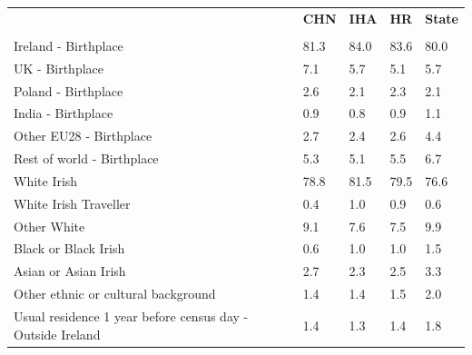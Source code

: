 \documentclass{article}
\begin{document}
\pagebreak
\begin{table}[h]	
\centering
		\begin{tabular}{KTTTT}
  \hline
& \textbf{CHN} & \textbf{IHA} & \textbf{HR}& \textbf{State}\\ 
  \hline
    \\ 
    \hline
Ireland - Birthplace & 81.3& 84.0& 83.6& 80.0\\
UK - Birthplace & 7.1& 5.7& 5.1& 5.7\\
Poland - Birthplace & 2.6& 2.1& 2.3& 2.1\\
India - Birthplace & 0.9& 0.8& 0.9& 1.1\\
Other EU28 - Birthplace & 2.7& 2.4& 2.6& 4.4\\
Rest of world - Birthplace & 5.3& 5.1& 5.5& 6.7\\
    \hline
White Irish & 78.8& 81.5& 79.5& 76.6\\
White Irish Traveller & 0.4& 1.0& 0.9& 0.6\\
Other White & 9.1& 7.6& 7.5& 9.9\\
Black or Black Irish & 0.6& 1.0& 1.0& 1.5\\
Asian or Asian Irish & 2.7& 2.3& 2.5& 3.3\\
Other ethnic or cultural background & 1.4& 1.4& 1.5& 2.0\\
    \hline
Usual residence 1 year before census day - Outside Ireland & 1.4& 1.3& 1.4& 1.8\\


\end{tabular}
\end{table}
\end{document}
